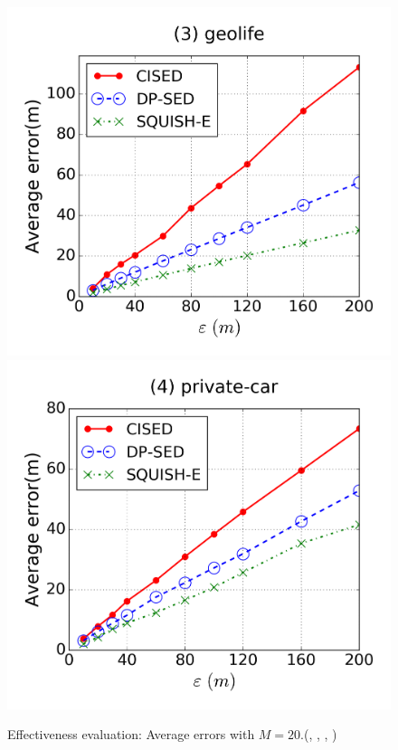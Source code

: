 \begin{figure}[tb]
\includegraphics[scale = 0.250]{figures/Exp-error-epsilon-geolife.png}
\includegraphics[scale = 0.250]{figures/Exp-error-epsilon-private.png}
\vspace{-3ex}
\caption{\small Effectiveness evaluation: Average errors with $M=20$.(\cist, \cista, \dpa, \squishe)}
\label{fig:ae-m20}
\vspace{-1ex}
\end{figure}

